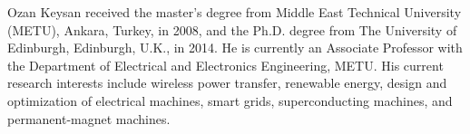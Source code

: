 \documentclass[journal]{IEEEtran}
\begin{document}
\begin{IEEEbiography}
{Ozan Keysan} received the master’s degree from Middle East Technical University (METU), Ankara, Turkey, in 2008, and the Ph.D. degree from The University of Edinburgh, Edinburgh, U.K., in 2014. 
He is currently an Associate  Professor with the Department of Electrical and Electronics Engineering, METU. 
His current research interests include wireless power transfer, renewable energy, design and optimization of electrical machines, smart grids, superconducting machines, and permanent-magnet machines.
\end{IEEEbiography}

\end{document}
